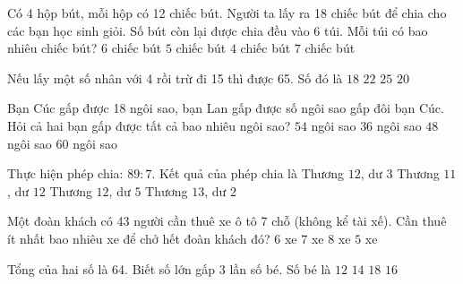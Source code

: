 \begin{ex} %
Có 4 hộp bút, mỗi hộp có 12 chiếc bút. Người ta lấy ra 18 chiếc bút để chia cho các bạn học sinh giỏi. Số bút còn lại được chia đều vào 6 túi. Mỗi túi có bao nhiêu chiếc bút?
\choice
{$6$ chiếc bút}
{\True $5$ chiếc bút}
{$4$ chiếc bút}
{$7$ chiếc bút}
\end{ex}

\begin{ex} %
Nếu lấy một số nhân với 4 rồi trừ đi 15 thì được 65. Số đó là
\choice
{$18$}
{$22$}
{$25$}
{\True $20$}
\end{ex}

\begin{ex} %
Bạn Cúc gấp được 18 ngôi sao, bạn Lan gấp được số ngôi sao gấp đôi bạn Cúc. Hỏi cả hai bạn gấp được tất cả bao nhiêu ngôi sao?
\choice
{\True $54$ ngôi sao}
{$36$ ngôi sao}
{$48$ ngôi sao}
{$60$ ngôi sao}
\end{ex}

\begin{ex} %
Thực hiện phép chia: $89 : 7$. Kết quả của phép chia là
\choice
{Thương $12$, dư $3$}
{Thương $11$, dư $12$}
{\True Thương $12$, dư $5$}
{Thương $13$, dư $2$}
\end{ex}

\begin{ex} %
Một đoàn khách có 43 người cần thuê xe ô tô 7 chỗ (không kể tài xế). Cần thuê ít nhất bao nhiêu xe để chở hết đoàn khách đó?
\choice
{$6$ xe}
{\True $7$ xe}
{$8$ xe}
{$5$ xe}
\end{ex}

\begin{ex} %
Tổng của hai số là 64. Biết số lớn gấp 3 lần số bé. Số bé là
\choice
{$12$}
{$14$}
{$18$}
{\True $16$}
\end{ex}

